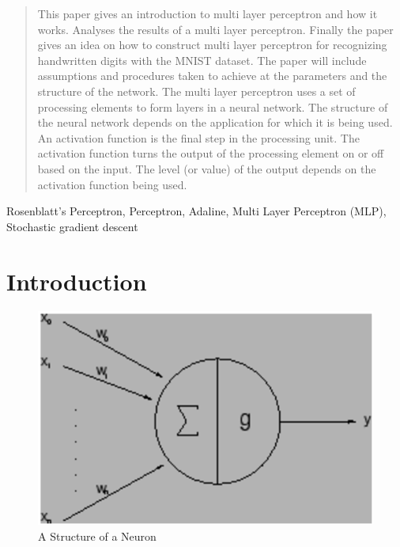 \documentclass[conference]{IEEEtran}
\begin{document}
\begin{abstract}
This paper gives an introduction to multi layer perceptron and how it works. Analyses the results of a multi layer perceptron. Finally the paper gives an idea on how to construct multi layer perceptron for recognizing handwritten digits with the MNIST dataset. The paper will include assumptions and procedures taken to achieve at the parameters and the structure of the network. The multi layer perceptron uses a set of processing elements to form layers in a neural network. The structure of the neural network depends on the application for which it is being used. An activation function is the final step in the processing unit. The activation function turns the output of the processing element on or off based on the input. The level (or value) of the output depends on the activation function being used.

\end{abstract}


\begin{IEEEkeywords} 
Rosenblatt's Perceptron, Perceptron, Adaline, Multi Layer Perceptron (MLP), Stochastic gradient descent
\end{IEEEkeywords}





%
\IEEEpeerreviewmaketitle



\section{Introduction}

\begin{figure}[h!]
\centering
\includegraphics[scale=0.5]{neuron}
\caption{A Structure of a Neuron}
\label{neuron}
\end{figure}
\end{document}
